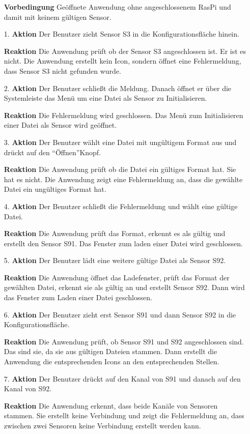 \documentclass[parskip=full]{scrartcl}
\begin{document}
\begin{itemize}
\begin{itemize}
\item []\textbf{Vorbedingung} Geöffnete Anwendung ohne angeschlossenem \gls{RasPi} und damit mit keinem gültigen Sensor.
\item [1.]\textbf{Aktion} Der Benutzer zieht Sensor S3 in die Konfigurationsfläche hinein.
\item []\textbf{Reaktion} Die Anwendung prüft ob der Sensor S3 angeschlossen ist. Er ist es nicht. Die Anwendung erstellt kein Icon, sondern öffnet eine Fehlermeldung, dass Sensor S3 nicht gefunden wurde.
\item [2.]\textbf{Aktion} Der Benutzer schließt die Meldung. Danach öffnet er über die Systemleiste das Menü um eine Datei als Sensor zu Initialisieren.
\item []\textbf{Reaktion} Die Fehlermeldung wird geschlossen. Das Menü zum Initialisieren einer Datei als Sensor wird geöffnet.
\item [3.]\textbf{Aktion} Der Benutzer wählt eine Datei mit ungültigem Format aus und drückt auf den "`Öffnen"'Knopf.
\item []\textbf{Reaktion} Die Anwendung prüft ob die Datei ein gültiges Format hat. Sie hat es nicht. Die Anwendung zeigt eine Fehlermeldung an, dass die gewählte Datei ein ungültiges Format hat.
\item [4.]\textbf{Aktion} Der Benutzer schließt die Fehlermeldung und wählt eine gültige Datei.
\item []\textbf{Reaktion} Die Anwendung prüft das Format, erkennt es als gültig und erstellt den Sensor S91. Das Fenster zum laden einer Datei wird geschlossen.
\item [5.]\textbf{Aktion} Der Benutzer lädt eine weitere gültige Datei als Sensor S92.
\item []\textbf{Reaktion} Die Anwendung öffnet das Ladefenster, prüft das Format der gewählten Datei, erkennt sie als gültig an und erstellt Sensor S92. Dann wird das Fenster zum Laden einer Datei geschlossen. 
\item [6.]\textbf{Aktion} Der Benutzer zieht erst Sensor S91 und dann Sensor S92 in die Konfigurationsfläche.
\item []\textbf{Reaktion} Die Anwendung prüft, ob Sensor S91 und S92 angeschlossen sind. Das sind sie, da sie aus gültigen Dateien stammen. Dann erstellt die Anwendung die entsprechenden Icons an den entsprechenden Stellen.
\item [7.]\textbf{Aktion} Der Benutzer drückt auf den Kanal von S91 und danach auf den Kanal von S92.
\item []\textbf{Reaktion} Die Anwendung erkennt, dass beide Kanäle von Sensoren stammen. Sie erstellt keine Verbindung und zeigt die Fehlermeldung an, dass zwischen zwei Sensoren keine Verbindung erstellt werden kann.

\end{itemize}
\end{itemize}
\end{document}
